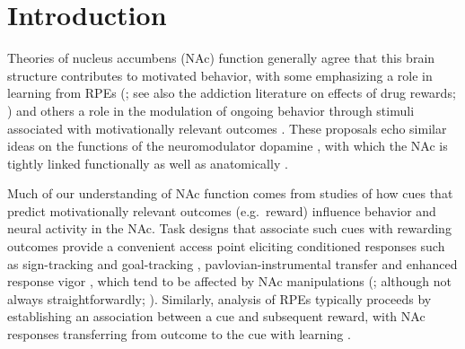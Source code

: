 \documentclass[11pt]{article}
\let\cite=\citep
\let\citeNP=\citealt
\begin{document}
\newpage

\section*{Introduction}

Theories of nucleus accumbens (NAc) function generally agree that this
brain structure contributes to motivated behavior, with some
emphasizing a role in learning from RPEs (\citeNP{Joel2002,Maia2009,Khamassi2012,Lee2012,Schultz2016,Averbeck2017}; see
  also the addiction literature on effects of drug
  rewards; \citeNP{Kalivas2005,Hyman2006,Carelli2009}) and others a role in
the modulation of ongoing behavior through stimuli associated with
motivationally relevant outcomes \cite[invigorating,
  directing;][]{Nicola2010a,Salamone2012,Floresco2015}. These
proposals echo similar ideas on the functions of the neuromodulator
dopamine \cite{Maia2009,Berridge2012,Salamone2012,Schultz2016}, with
which the NAc is tightly linked functionally as well as anatomically
\cite{Cheer2007,Ikemoto2007,DuHoffmann2014,Takahashi2016}.

Much of our understanding of NAc function comes from studies of how
cues that predict motivationally relevant outcomes (e.g.\ reward)
influence behavior and neural activity in the NAc. Task designs that
associate such cues with rewarding outcomes provide a convenient
access point eliciting conditioned responses such as sign-tracking and
goal-tracking \cite{hearst1974sign,Robinson2009},
pavlovian-instrumental transfer \cite{Estes1943,Rescorla1967} and
enhanced response vigor \cite{Niv2007,Nicola2010a}, which tend to be
affected by NAc manipulations (\citeNP{Corbit2011,Flagel2011,Chang2012};
although not always
  straightforwardly; \citeNP{Giertler2004,Chang2013}). Similarly, analysis
of RPEs typically proceeds by establishing an association between a
cue and subsequent reward, with NAc responses transferring from
outcome to the cue with learning
\cite{Schultz1997,Setlow2003,Roitman2005,Day2007a}.
\end{document}
